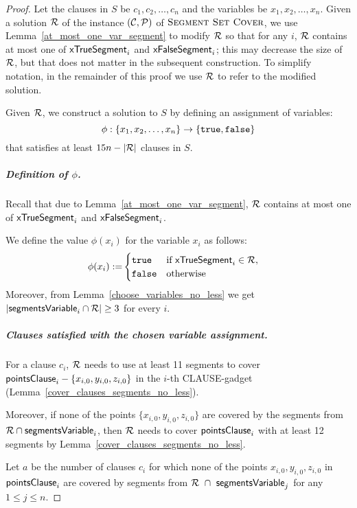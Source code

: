\begin{proof}\leavevmode
Let the clauses in $S$ be $c_1,c_2,\ldots,c_n$
and the variables be $x_1,x_2,\ldots,x_n$.
Given a solution $\mathcal{R}$
of the instance $(\mathcal{C}, \mathcal{P})$ of $\textsc{Segment Set Cover}$,
we use Lemma~\ref{at_most_one_var_segment} to modify $\mathcal{R}$
so that for any $i$, $\mathcal{R}$ contains at most
one of $\mathsf{xTrueSegment}_{i}$ and $\mathsf{xFalseSegment}_{i}$;
this may decrease the size of $\mathcal{R}$,
but that does not matter in the subsequent construction.
To simplify notation,
in the remainder of this proof we use $\mathcal{R}$ to refer to the modified solution.

Given $\mathcal{R}$, we construct a solution to $S$ by defining an
assignment of variables:
$$\phi : \{ x_1, x_2, \ldots, x_n\} \rightarrow \{\texttt{true}, \texttt{false}\}$$
that satisfies at least $15n-|\mathcal{R}|$ clauses in $S$.

\subparagraph{Definition of $\phi$.}
Recall that due to Lemma~\ref{at_most_one_var_segment},
$\mathcal{R}$ contains at most one of $\mathsf{xTrueSegment}_{i}$ and $\mathsf{xFalseSegment}_{i}$.

We define the value $\phi(x_i)$ for the variable $x_i$ as follows:
\begin{align}
	\begin{split}
	\label{eqn:variable_assignment}
	\phi(x_i) := & \begin{cases}
	\texttt{true} & \text{if}\ \mathsf{xTrueSegment}_{i} \in \mathcal{R}, \\
	\texttt{false} & \text{otherwise}
	\end{cases}
	\end{split}
\end{align}
Moreover, from Lemma~\ref{choose_variables_no_less} we get $|\mathsf{segmentsVariable}_{i} \cap \mathcal{R}| \ge 3$ for every $i$.

\subparagraph{Clauses satisfied with the chosen variable assignment.}

For a clause $c_i$,
$\mathcal{R}$ needs to use at least 11 segments to cover $\mathsf{pointsClause}_{i} - \{x_{i,0}, y_{i,0}, z_{i,0}\}$
in the $i$-th CLAUSE-gadget (Lemma~\ref{cover_clauses_segments_no_less}).

Moreover, if none of the points $\{x_{i,0}, y_{i,0}, z_{i,0}\}$
are covered by the segments from $\mathcal{R} \cap \mathsf{segmentsVariable}_{i}$,
then $\mathcal{R}$ needs to cover $\mathsf{pointsClause}_{i}$
with at least 12 segments
by Lemma~\ref{cover_clauses_segments_no_less}.

Let $a$ be the number of clauses $c_i$ for which none of
the points $x_{i,0}, y_{i,0}, z_{i,0}$ in $\mathsf{pointsClause}_{i}$ are covered by
segments from $\mathcal{R}~\cap~\mathsf{segmentsVariable}_{j}$ for any $1 \le j \le n$.


\end{proof}
